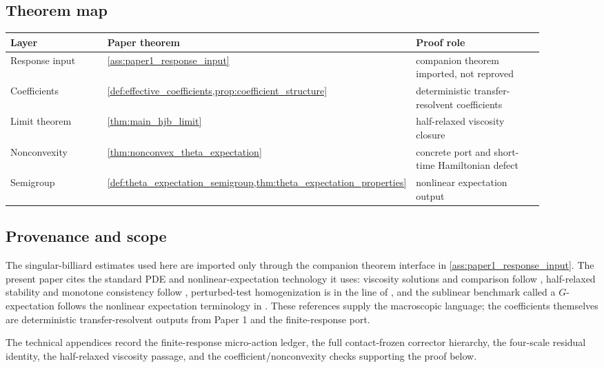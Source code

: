 \documentclass[11pt]{amsart}
\theoremstyle{definition}
\theoremstyle{remark}
\begin{document}
\subsection{Theorem map}

\begin{center}
\small
\begin{tabular}{p{0.22\linewidth}p{0.36\linewidth}p{0.32\linewidth}}
\hline
Layer & Paper theorem & Proof role \\
\hline
Response input & \cref{ass:paper1_response_input} &
companion theorem imported, not reproved \\
Coefficients & \cref{def:effective_coefficients,prop:coefficient_structure} &
deterministic transfer-resolvent coefficients \\
Limit theorem & \cref{thm:main_hjb_limit} &
half-relaxed viscosity closure \\
Nonconvexity & \cref{thm:nonconvex_theta_expectation} &
concrete port and short-time Hamiltonian defect \\
Semigroup & \cref{def:theta_expectation_semigroup,thm:theta_expectation_properties} &
nonlinear expectation output \\
\hline
\end{tabular}
\end{center}

\subsection{Provenance and scope}

The singular-billiard estimates used here are imported only through the
companion theorem interface in \cref{ass:paper1_response_input}.  The present
paper cites the standard PDE and nonlinear-expectation technology it uses:
viscosity solutions and comparison follow
\cite{CrandallIshiiLions1992,FlemingSoner2006}, half-relaxed stability and
monotone consistency follow \cite{BarlesSouganidis1991}, perturbed-test
homogenization is in the line of
\cite{BensoussanLionsPapanicolaou1978,Evans1992,PavliotisStuart2008}, and the
sublinear benchmark called a \(G\)-expectation follows the nonlinear
expectation terminology in \cite{Peng2019}.  These references supply the
macroscopic language; the coefficients themselves are deterministic
transfer-resolvent outputs from Paper 1 and the finite-response port.

The technical appendices record the finite-response micro-action ledger, the
full contact-frozen corrector hierarchy, the four-scale residual identity, the
half-relaxed viscosity passage, and the coefficient/nonconvexity checks
supporting the proof below.
\end{document}
